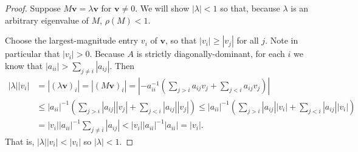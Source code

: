 \documentclass[12pt]{amsart}
\newcommand{\bv}{\mathbf{v}}
\begin{document}
\begin{proof} Suppose $M\bv = \lambda \bv$ for $\bv\ne 0$.  We will show $|\lambda|<1$ so that, because $\lambda$ is an arbitrary eigenvalue of $M$, $\rho(M)<1$.

Choose the largest-magnitude entry $v_i$ of $\bv$, so that $|v_i| \ge |v_j|$ for all $j$.  Note in particular that $|v_i| > 0$.  Because $A$ is strictly diagonally-dominant, for each $i$ we know that $|a_{ii}| > \sum_{j\ne i} |a_{ij}|$.  Then
\begin{align*}
|\lambda| |v_i| &= |(\lambda\bv)_i| = |(M\bv)_i| = \left|- a_{ii}^{-1} \left(\sum_{j>i} a_{ij} v_j + \sum_{j<i} a_{ij} v_j\right)\right| \\
  &\le |a_{ii}|^{-1} \left(\sum_{j>i} |a_{ij}| |v_j| + \sum_{j<i} |a_{ij}| |v_j|\right) \le |a_{ii}|^{-1} \left(\sum_{j>i} |a_{ij}| |v_i| + \sum_{j<i} |a_{ij}| |v_i|\right) \\
  &= |v_i| |a_{ii}|^{-1} \sum_{j\ne i} |a_{ij}| < |v_i| |a_{ii}|^{-1} |a_{ii}| = |v_i|.
\end{align*}
That is, $|\lambda| |v_i| < |v_i|$ so $|\lambda|<1$.
\end{proof}
\end{document}
